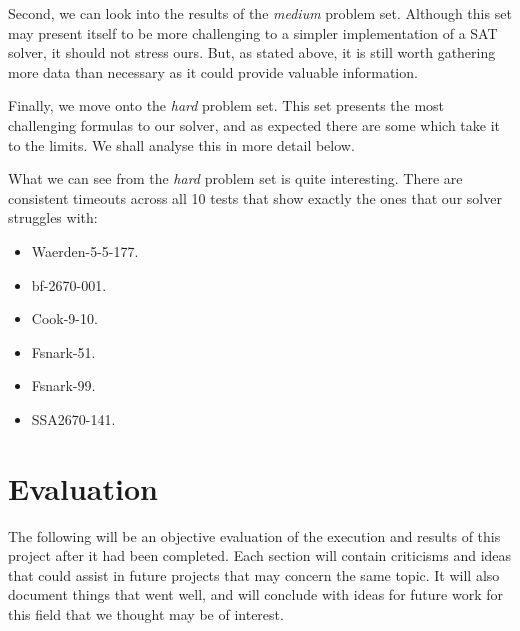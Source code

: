 \documentclass{article}
\begin{document}

Second, we can look into the results of the \textit{medium} problem set. Although this set may present itself to be more
challenging to a simpler implementation of a SAT solver, it should not stress ours. But, as stated above, it is still worth
gathering more data than necessary as it could provide valuable information. 


Finally, we move onto the \textit{hard} problem set. This set presents the most challenging formulas to our solver, and as
expected there are some which take it to the limits. We shall analyse this in more detail below.


What we can see from the \textit{hard} problem set is quite interesting. There are consistent timeouts across all 10 tests that
show exactly the ones that our solver struggles with:

\begin{itemize}
    \item Waerden-5-5-177.
    \item bf-2670-001.
    \item Cook-9-10.
    \item Fsnark-51.
    \item Fsnark-99.
    \item SSA2670-141.
\end{itemize}


\section{Evaluation}
The following will be an objective evaluation of the execution and results of this project after it had been completed. Each
section will contain criticisms and ideas that could assist in future projects that may concern the same topic. It will also
document things that went well, and will conclude with ideas for future work for this field that we thought may be of interest.
\end{document}
